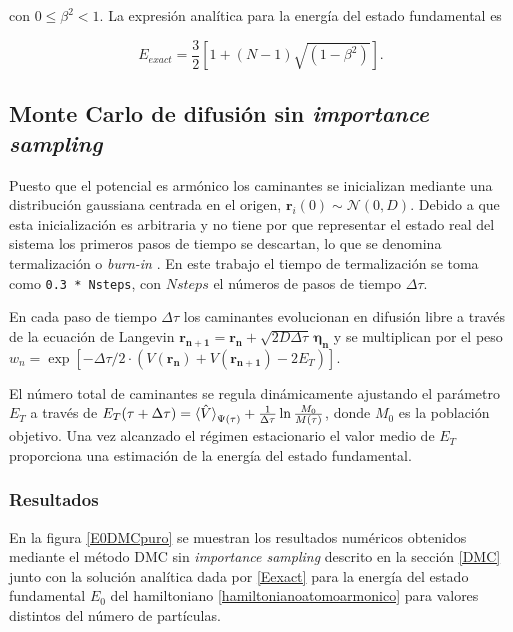 \documentclass[11pt,a4paper,twoside,pdf]{article}
\numberwithin{equation}{section}
\begin{document}
con $0 \leq \beta^2 <1$. La expresión analítica para la energía del estado fundamental es \cite{armstrong2012quantum}

\begin{equation}
    E_{exact} = \frac{3}{2} \left[ 1 + (N-1) \sqrt{(1 - \beta^2)}\right].
\label{Eexact}
\end{equation}
    





\subsection{Monte Carlo de difusión sin \textit{importance sampling}}




Puesto que el potencial es armónico los caminantes se inicializan mediante una distribución gaussiana centrada en el origen, $\mathbf r_i(0)\sim \mathcal N(0, D)$. Debido a que esta inicialización es arbitraria y no tiene por que representar el estado real del sistema los primeros pasos de tiempo se descartan, lo que se denomina termalización o \textit{burn-in} \cite{newman1999monte}. En este trabajo el tiempo de termalización se toma como \texttt{0.3 * Nsteps}, con $Nsteps$ el números de pasos de tiempo $\Delta \tau$.



En cada paso de tiempo $\Delta\tau$ los caminantes evolucionan en difusión libre a través de la ecuación de Langevin $\mathbf{r_{n+1}} = \mathbf{r_n} + \sqrt{2D\Delta \tau}  \, \boldsymbol{\eta_n}$ y se multiplican por el peso $w_n = \exp \left[ - \Delta \tau / 2 \cdot ( V(\mathbf{r_n}) + V(\mathbf{r_{n+1}})- 2E_T) \right]$.



El número total de caminantes se regula dinámicamente ajustando el parámetro $E_T$ a través de $E_T(\tau+\Delta\tau) = \braket{\hat{V}}_{\Psi(\tau)} + \frac{1}{\Delta\tau} \ln\frac{M_0}{M(\tau)}$, donde $M_0$ es la población objetivo. Una vez alcanzado el régimen estacionario el valor medio de $E_T$ proporciona una estimación de la energía del estado fundamental.




\subsubsection{Resultados}





En la figura \ref{E0DMCpuro} se muestran los resultados numéricos obtenidos mediante el método DMC sin \textit{importance sampling} descrito en la sección \ref{DMC} junto con la solución analítica dada por \ref{Eexact} para la energía del estado fundamental $E_0$ del hamiltoniano \ref{hamiltonianoatomoarmonico} para valores distintos del número de partículas.
\end{document}
